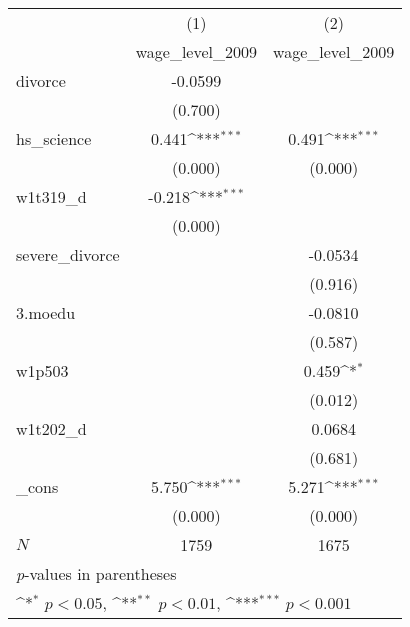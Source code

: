 {
\def\sym#1{\ifmmode^{#1}\else\(^{#1}\)\fi}
\begin{tabular}{l*{2}{c}}
\hline\hline
            &\multicolumn{1}{c}{(1)}&\multicolumn{1}{c}{(2)}\\
            &\multicolumn{1}{c}{wage\_level\_2009}&\multicolumn{1}{c}{wage\_level\_2009}\\
\hline
divorce     &     -0.0599         &                     \\
            &     (0.700)         &                     \\
[1em]
hs\_science  &       0.441\sym{***}&       0.491\sym{***}\\
            &     (0.000)         &     (0.000)         \\
[1em]
w1t319\_d    &      -0.218\sym{***}&                     \\
            &     (0.000)         &                     \\
[1em]
severe\_divorce&                     &     -0.0534         \\
            &                     &     (0.916)         \\
[1em]
3.moedu     &                     &     -0.0810         \\
            &                     &     (0.587)         \\
[1em]
w1p503      &                     &       0.459\sym{*}  \\
            &                     &     (0.012)         \\
[1em]
w1t202\_d    &                     &      0.0684         \\
            &                     &     (0.681)         \\
[1em]
\_cons      &       5.750\sym{***}&       5.271\sym{***}\\
            &     (0.000)         &     (0.000)         \\
\hline
\(N\)       &        1759         &        1675         \\
\hline\hline
\multicolumn{3}{l}{\footnotesize \textit{p}-values in parentheses}\\
\multicolumn{3}{l}{\footnotesize \sym{*} \(p<0.05\), \sym{**} \(p<0.01\), \sym{***} \(p<0.001\)}\\
\end{tabular}
}
